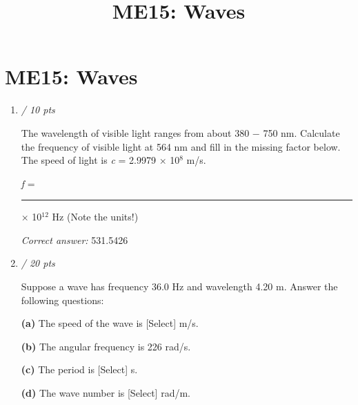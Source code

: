 \documentclass[11pt]{article}
\title{ME15: Waves}
\author{}
\date{}
\begin{document}
\maketitle

\section*{ME15: Waves}

\begin{enumerate}[leftmargin=*,label=\textbf{Question \arabic*.}]
\item \hfill \textit{/ 10 pts}

The wavelength of visible light ranges from about 380 − 750 nm. Calculate the frequency of visible light at 564 nm and fill in the missing factor below. The speed of light is \emph{c} = 2.9979 × 10$^{8}$ m/s.



\emph{f }= \rule{2cm}{0.4pt} × 10$^{12}$ Hz (Note the units!)

\textit{Correct answer: } 531.5426

\item \hfill \textit{/ 20 pts}

Suppose a wave has frequency 36.0 Hz and wavelength 4.20 m. Answer the following questions:

\textbf{(a) }The speed of the wave is [Select]
 m/s.

\textbf{(b)} The angular frequency is 226
 rad/s.

\textbf{(c)} The period is [Select]
 s.

\textbf{(d)} The wave number is [Select]
 rad/m.


\end{enumerate}
\end{document}
